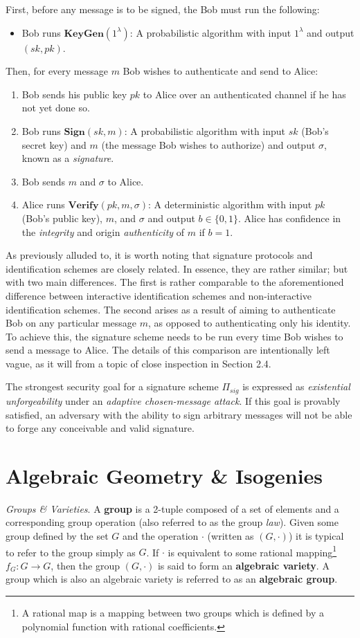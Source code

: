 \noindent
First, before any message is to be signed, the Bob must run the following:
\begin{itemize}
\item Bob runs $\textbf{KeyGen}(1^\lambda)$: A probabilistic algorithm with input $1^\lambda$ and output $(sk,pk)$.
\end{itemize}
Then, for every message $m$ Bob wishes to authenticate and send to Alice:
\begin{enumerate}[label=(\roman*)]
\item Bob sends his public key $pk$ to Alice over an authenticated channel if he has not yet done so.
\item Bob runs $\textbf{Sign}(sk, m)$: A probabilistic algorithm with input $sk$ (Bob's secret key) and $m$ (the message Bob wishes to authorize) and output $\sigma$, known as a \emph{signature}.
\item Bob sends $m$ and $\sigma$ to Alice.
\item Alice runs $\textbf{Verify}(pk, m, \sigma)$: A deterministic algorithm with input $pk$ (Bob's public key), $m$, and $\sigma$ and output $b \in \{0,1\}$. Alice has confidence in the \emph{integrity} and origin \emph{authenticity} of $m$ if $b = 1$.
\end{enumerate}

As previously alluded to, it is worth noting that signature protocols and identification schemes are closely related. In essence, they are rather similar; but with two main differences. The first is rather comparable to the aforementioned difference between interactive identification schemes and non-interactive identification schemes. The second arises as a result of aiming to authenticate Bob on any particular message $m$, as opposed to authenticating only his identity. To achieve this, the signature scheme needs to be run every time Bob wishes to send a message to Alice. The details of this comparison are intentionally left vague, as it will from a topic of close inspection in Section 2.4.

The strongest security goal for a signature scheme $\Pi_{sig}$ is expressed as \emph{existential unforgeability} under an \emph{adaptive chosen-message attack}. If this goal is provably satisfied, an adversary with the ability to sign arbitrary messages will not be able to forge any conceivable and valid signature.

\section{Algebraic Geometry \& Isogenies}
\emph{Groups \& Varieties}. A \textbf{group} is a 2-tuple composed of a set of elements and a corresponding group operation (also referred to as the group \emph{law}). Given some group defined by the set $G$ and the operation $\cdot$ (written as $(G,\cdot)$) it is typical to refer to the group simply as $G$. If $\cdot$ is equivalent to some rational mapping\footnote{A rational map is a mapping between two groups which is defined by a polynomial function with rational coefficients.} $f_G: G \rightarrow G$, then the group $(G,\cdot)$ is said to form an \textbf{algebraic variety}. A group which is also an algebraic variety is referred to as an \textbf{algebraic group}.


